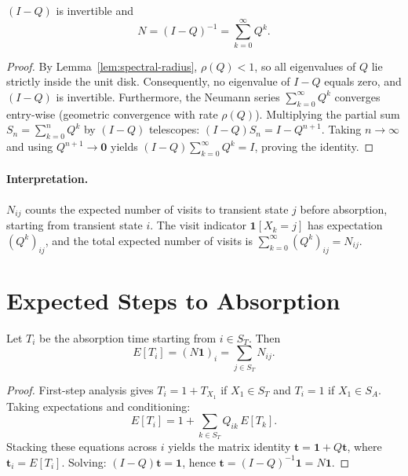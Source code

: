 \begin{theorem}
\label{thm:fundamental}
$(I - Q)$ is invertible and
\begin{equation}
\label{eq:A-fundamental}
N = (I - Q)^{-1} = \sum_{k=0}^{\infty} Q^k.
\end{equation}
\end{theorem}

\begin{proof}
By Lemma~\ref{lem:spectral-radius}, $\rho(Q) < 1$, so all eigenvalues of
$Q$ lie strictly inside the unit disk. Consequently, no eigenvalue of $I-Q$
equals zero, and $(I-Q)$ is invertible. Furthermore, the Neumann series
$\sum_{k=0}^{\infty} Q^k$ converges entry-wise (geometric convergence with
rate $\rho(Q)$). Multiplying the partial sum
$S_n = \sum_{k=0}^{n} Q^k$ by $(I - Q)$ telescopes:
$(I - Q) S_n = I - Q^{n+1}$. Taking $n \to \infty$ and using
$Q^{n+1} \to \mathbf{0}$ yields $(I - Q) \sum_{k=0}^{\infty} Q^k = I$,
proving the identity.
\end{proof}

\paragraph{Interpretation.} $N_{ij}$ counts the expected number of visits
to transient state $j$ before absorption, starting from transient state
$i$. The visit indicator $\mathbf{1}[X_k = j]$ has expectation
$(Q^k)_{ij}$, and the total expected number of visits is
$\sum_{k=0}^{\infty} (Q^k)_{ij} = N_{ij}$.


\section{Expected Steps to Absorption}
\label{app:A-expected}

\begin{theorem}
\label{thm:expected-time}
Let $T_i$ be the absorption time starting from $i \in S_T$. Then
\begin{equation}
\label{eq:A-expected}
E[T_i] = (N \mathbf{1})_i = \sum_{j \in S_T} N_{ij}.
\end{equation}
\end{theorem}

\begin{proof}
First-step analysis gives $T_i = 1 + T_{X_1}$ if $X_1 \in S_T$ and
$T_i = 1$ if $X_1 \in S_A$. Taking expectations and conditioning:
\begin{equation}
E[T_i] = 1 + \sum_{k \in S_T} Q_{ik} \, E[T_k].
\end{equation}
Stacking these equations across $i$ yields the matrix identity
$\mathbf{t} = \mathbf{1} + Q \mathbf{t}$, where
$\mathbf{t}_i = E[T_i]$. Solving: $(I - Q) \mathbf{t} = \mathbf{1}$, hence
$\mathbf{t} = (I - Q)^{-1} \mathbf{1} = N \mathbf{1}$.
\end{proof}


